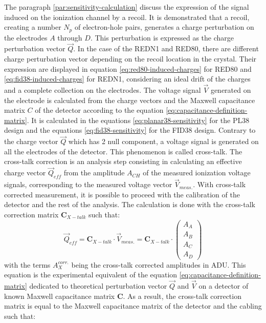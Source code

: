 The paragraph \ref{par:sensitivity-calculation} discuss the expression of the signal induced on the ionization channel by a recoil. It is demonstrated that a recoil, creating a number $N_p$ of electron-hole pairs, generates a charge perturbation on the electrodes $A$ through $D$. This perturbation is expressed as the charge perturbation vector $\vec{Q}$. In the case of the REDN1 and RED80, there are different charge perturbation vector depending on the recoil location in the crystal. Their expression are displayed in equation \ref{eq:red80-induced-charges} for RED80 and \ref{eq:fid38-induced-charges} for REDN1, considering an ideal drift of the charges and a complete collection on the electrodes.
The voltage signal $\vec{V}$ generated on the electrode is calculated from the charge vectors and the Maxwell capacitance matrix $C$ of the detector according to the equation \ref{eq:capacitance-definition-matrix}. It is calculated in the equations \ref{eq:planar38-sensitivity} for the PL38 design and the equations \ref{eq:fid38-sensitivity} for the FID38 design. Contrary to the charge vector $\vec{Q}$ which has 2 null component, a voltage signal is generated on all the electrodes of the detector. This phenomenon is called cross-talk.
The cross-talk correction is an analysis step consisting in calculating an effective charge vector $\vec{Q}_{eff}$ from the amplitude $A_{CH}$ of the measured ionization voltage signals, corresponding to the measured voltage vector $\vec{V}_{meas.}$. With cross-talk corrected measurement, it is possible to proceed with the calibration of the detector and the rest of the analysis.
The calculation is done with the cross-talk correction matrix $\bm{C}_{X-talk}$ such that:
\begin{equation}
\label{fig:cross-talk-correction}
\vec{Q}_{eff} = \bm{C}_{X-talk} \cdot \vec{V}_{meas.} =
\bm{C}_{X-talk} \cdot
\begin{pmatrix}
A_A \\ A_B \\ A_C \\ A_D
\end{pmatrix}
\end{equation}
with the terms $A_X^{corr.}$ being the cross-talk corrected amplitudes in ADU.
This equation is the experimental equivalent of the equation \ref{eq:capacitance-definition-matrix} dedicated to theoretical perturbation vector $\vec{Q}$ and $\vec{V}$ on a detector of known Maxwell capacitance matrix $\bm{C}$. As a result, the cross-talk correction matrix is equal to the Maxwell capacitance matrix of the detector and the cabling such that:
